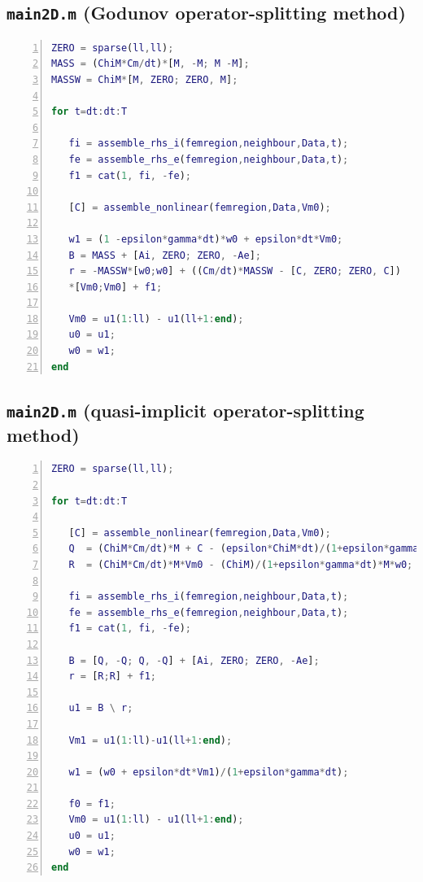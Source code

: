 \documentclass[a4paper,11pt]{article}
\begin{document}
\subsection{\texttt{main2D.m} (Godunov operator-splitting method)}\label{GO}
\begin{lstlisting}[language=Matlab,basicstyle=\small, numbers=left, numberstyle=\tiny,  name = main2D.m (Godunov operator-splitting), frame=single]
ZERO = sparse(ll,ll);
MASS = (ChiM*Cm/dt)*[M, -M; M -M];
MASSW = ChiM*[M, ZERO; ZERO, M];

for t=dt:dt:T

   fi = assemble_rhs_i(femregion,neighbour,Data,t);
   fe = assemble_rhs_e(femregion,neighbour,Data,t);
   f1 = cat(1, fi, -fe);

   [C] = assemble_nonlinear(femregion,Data,Vm0);

   w1 = (1 -epsilon*gamma*dt)*w0 + epsilon*dt*Vm0;
   B = MASS + [Ai, ZERO; ZERO, -Ae];
   r = -MASSW*[w0;w0] + ((Cm/dt)*MASSW - [C, ZERO; ZERO, C])
   *[Vm0;Vm0] + f1;

   Vm0 = u1(1:ll) - u1(ll+1:end);
   u0 = u1;
   w0 = w1;
end
\end{lstlisting}

\subsection{\texttt{main2D.m} (quasi-implicit operator-splitting method)}\label{OS}
\begin{lstlisting}[language=Matlab,basicstyle=\small, numbers=left, numberstyle=\tiny,  name = main2D.m (quasi-implicit operator-splitting), frame=single]
ZERO = sparse(ll,ll);
        
for t=dt:dt:T
        
   [C] = assemble_nonlinear(femregion,Data,Vm0);
   Q  = (ChiM*Cm/dt)*M + C - (epsilon*ChiM*dt)/(1+epsilon*gamma*dt)*M;
   R  = (ChiM*Cm/dt)*M*Vm0 - (ChiM)/(1+epsilon*gamma*dt)*M*w0;
    
   fi = assemble_rhs_i(femregion,neighbour,Data,t);
   fe = assemble_rhs_e(femregion,neighbour,Data,t);
   f1 = cat(1, fi, -fe);
    
   B = [Q, -Q; Q, -Q] + [Ai, ZERO; ZERO, -Ae];
   r = [R;R] + f1;
        
   u1 = B \ r; 
        
   Vm1 = u1(1:ll)-u1(ll+1:end);

   w1 = (w0 + epsilon*dt*Vm1)/(1+epsilon*gamma*dt);
    
   f0 = f1;
   Vm0 = u1(1:ll) - u1(ll+1:end);
   u0 = u1;
   w0 = w1;
end
\end{lstlisting}
\end{document}
